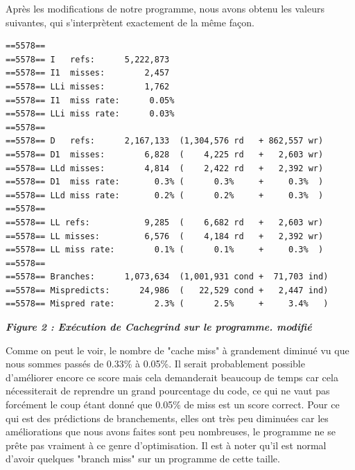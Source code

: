 \documentclass{report}
\begin{document}
Après les modifications de notre programme, nous avons obtenu les valeurs suivantes, qui s’interprètent exactement de la même façon.
\begin{scriptsize}
\begin{lstlisting}
==5578== 
==5578== I   refs:      5,222,873
==5578== I1  misses:        2,457
==5578== LLi misses:        1,762
==5578== I1  miss rate:      0.05%
==5578== LLi miss rate:      0.03%
==5578== 
==5578== D   refs:      2,167,133  (1,304,576 rd   + 862,557 wr)
==5578== D1  misses:        6,828  (    4,225 rd   +   2,603 wr)
==5578== LLd misses:        4,814  (    2,422 rd   +   2,392 wr)
==5578== D1  miss rate:       0.3% (      0.3%     +     0.3%  )
==5578== LLd miss rate:       0.2% (      0.2%     +     0.3%  )
==5578== 
==5578== LL refs:           9,285  (    6,682 rd   +   2,603 wr)
==5578== LL misses:         6,576  (    4,184 rd   +   2,392 wr)
==5578== LL miss rate:        0.1% (      0.1%     +     0.3%  )
==5578== 
==5578== Branches:      1,073,634  (1,001,931 cond +  71,703 ind)
==5578== Mispredicts:      24,986  (   22,529 cond +   2,447 ind)
==5578== Mispred rate:        2.3% (      2.5%     +     3.4%   )
\end{lstlisting}
\begin{center}
\textbf{\textit{Figure 2 : Exécution de Cachegrind sur le programme. modifié}}
\end{center}

Comme on peut le voir, le nombre de "cache miss" à grandement diminué vu que nous sommes passés de 0.33\% à 0.05\%. 
\newline
Il serait probablement possible d'améliorer encore ce score mais cela demanderait beaucoup de temps car cela nécessiterait de reprendre un grand pourcentage du code, ce qui ne vaut pas forcément le coup étant donné que 0.05\% de miss est un score correct.
\newline
Pour ce qui est des prédictions de branchements, elles ont très peu diminuées car les améliorations que nous avons faites sont peu nombreuses, le programme ne se prête pas vraiment à ce genre d'optimisation.
\newline
Il est à noter qu'il est normal d'avoir quelques "branch miss" sur un programme de cette taille.
\end{scriptsize}
\end{document}

